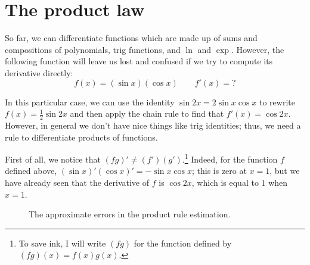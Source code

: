 \section{The product law}

So far, we can differentiate functions which are made up of sums and compositions
of polynomials, trig functions, and $ \ln $ and $ \exp $. However, the following
function will leave us lost and confused if we try to compute its derivative directly:
\begin{displaymath}
  f(x) = (\sin x) (\cos x) \qquad f'(x) = ?
\end{displaymath}

In this particular case, we can use the identity $ \sin 2x = 2\sin x \cos x $
to rewrite $ f(x) = \frac{1}{2} \sin 2x $ and then apply the chain rule to
find that $ f'(x) = \cos 2x $. However, in general we don't have nice things
like trig identities; thus, we need a rule to differentiate products of functions.

First of all, we notice that $ (fg)' \neq (f')(g') $.\footnote{To save ink, I will
write $ (fg) $ for the function defined by $ (fg)(x) = f(x) g(x) $.} Indeed, for
the function $ f $ defined above, $ (\sin x)' (\cos x)' = -\sin x \cos x $; this
is zero at $ x = 1 $, but we have already seen that the derivative of $ f $ is $ \cos 2x $,
which is equal to $ 1 $ when $ x = 1 $.

\begin{figure}
  \centering
  \caption{The approximate errors in the product rule estimation.}
\end{figure}

